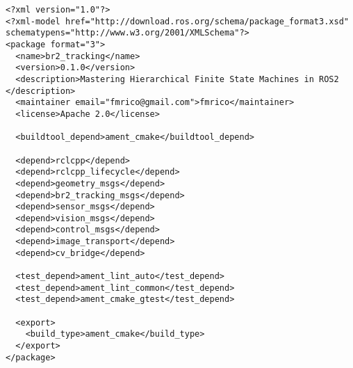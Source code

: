  \footnotesize
\begin{tcolorbox}[sharp corners, colframe=gray!80, colback=LightGray, left=0pt, top=0pt, bottom=0pt, title=\texttt{br2\_tracking/package.xml}]
  \begin{verbatim}
<?xml version="1.0"?>
<?xml-model href="http://download.ros.org/schema/package_format3.xsd" schematypens="http://www.w3.org/2001/XMLSchema"?>
<package format="3">
  <name>br2_tracking</name>
  <version>0.1.0</version>
  <description>Mastering Hierarchical Finite State Machines in ROS2 </description>
  <maintainer email="fmrico@gmail.com">fmrico</maintainer>
  <license>Apache 2.0</license>

  <buildtool_depend>ament_cmake</buildtool_depend>

  <depend>rclcpp</depend>
  <depend>rclcpp_lifecycle</depend>
  <depend>geometry_msgs</depend>
  <depend>br2_tracking_msgs</depend>
  <depend>sensor_msgs</depend>
  <depend>vision_msgs</depend>
  <depend>control_msgs</depend>
  <depend>image_transport</depend>
  <depend>cv_bridge</depend>

  <test_depend>ament_lint_auto</test_depend>
  <test_depend>ament_lint_common</test_depend>
  <test_depend>ament_cmake_gtest</test_depend>

  <export>
    <build_type>ament_cmake</build_type>
  </export>
</package>
    \end{verbatim}
    \end{tcolorbox}
  \normalsize

